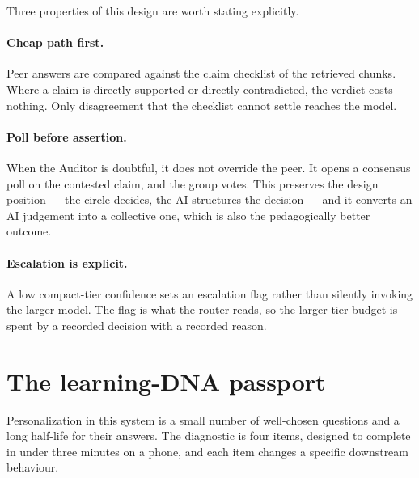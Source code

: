 Three properties of this design are worth stating explicitly.

\paragraph{Cheap path first.} Peer answers are compared against the claim checklist of the
retrieved chunks. Where a claim is directly supported or directly contradicted, the verdict
costs nothing. Only disagreement that the checklist cannot settle reaches the model.

\paragraph{Poll before assertion.} When the Auditor is doubtful, it does not override the
peer. It opens a consensus poll on the contested claim, and the group votes. This
preserves the design position --- the circle decides, the AI structures the decision ---
and it converts an AI judgement into a collective one, which is also the pedagogically
better outcome.

\paragraph{Escalation is explicit.} A low compact-tier confidence sets an escalation flag
rather than silently invoking the larger model. The flag is what the router reads, so the
larger-tier budget is spent by a recorded decision with a recorded reason.

\section{The learning-DNA passport}
\label{sec:dna}

Personalization in this system is a small number of well-chosen questions and a long
half-life for their answers. The diagnostic is four items, designed to complete in under
three minutes on a phone, and each item changes a specific downstream behaviour.

